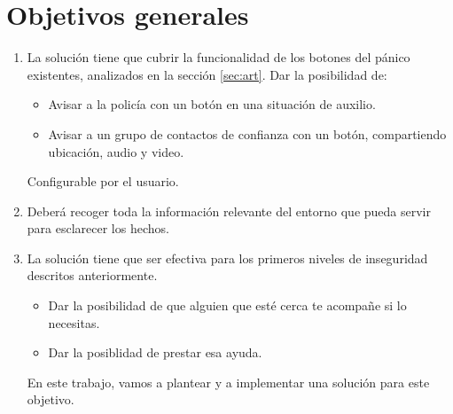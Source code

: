 \section{Objetivos generales}\label{sec:obj}
\begin{enumerate}
  \item La solución tiene que cubrir la funcionalidad de los botones del pánico existentes, analizados en la sección \ref{sec:art}.
  Dar la posibilidad de: 
  \begin{itemize}
    \item Avisar a la policía con un botón en una situación de auxilio.
    \item Avisar a un grupo de contactos de confianza con un botón, compartiendo ubicación, audio y video.
  \end{itemize}
  Configurable por el usuario.
  \item Deberá recoger toda la información relevante del entorno que pueda servir para esclarecer los hechos.
  \item La solución tiene que ser efectiva para los primeros niveles de inseguridad descritos anteriormente.
  \begin{itemize}
    \item Dar la posibilidad de que alguien que esté cerca te acompañe si lo necesitas.
    \item Dar la posiblidad de prestar esa ayuda.
  \end{itemize}
En este trabajo, vamos a plantear y a implementar una solución para este objetivo.
\end{enumerate}

